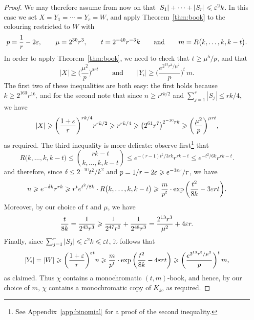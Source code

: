 \begin{proof}
  We may therefore assume from now on that  $|S_1| + \cdots + |S_r| \leqslant \varepsilon^2 k$. 
  In this case we set $X = Y_1 = \cdots = Y_r = W$, and apply Theorem~\ref{thm:book} to the colouring restricted to $W$ with 
  $$p = \frac{1}{r} - 2\varepsilon, \qquad \mu = 2^{30} r^3, \qquad t = 2^{-40} r^{-3} k \qquad \text{and} \qquad m = R\big( k, \ldots, k, k - t \big).$$
  In order to apply Theorem~\ref{thm:book}, we need to check that $t \ge \mu^5/p$, and that
  $$|X| \ge \bigg( \frac{\mu^2}{p} \bigg)^{\mu r t} \qquad \text{and} \qquad |Y_i| \ge \bigg( \frac{e^{2^{13} r^3 / \mu^2}}{p} \bigg)^t \, m.$$
  The first two of these inequalities are both easy: the first holds because $k \ge 2^{160} r^{16}$, and for the second note that since $n \ge r^{rk/2}$ and $\sum_{j = 1}^r |S_j| \le rk/4$, we have
  $$|X| \geqslant \bigg( \frac{1+\varepsilon}{r} \bigg)^{rk/4} r^{rk/2} \geqslant r^{rk/4} \geqslant \big( 2^{61} r^7 \big)^{2^{-10} r k} \geqslant \bigg( \frac{\mu^2}{p} \bigg)^{\mu r t},$$
  as required. The third inequality is more delicate: observe first\footnote{See Appendix~\ref{app:binomial} for a proof of the second inequality.} that 
  $$R\big( k, \ldots, k, k-t \big) \le \binom{rk-t}{k,\dots,k,k-t} \le e^{-(r-1)t^2/3rk} r^{rk-t} \le e^{-t^2/6k} r^{rk-t}.$$
  and therefore, since $\delta \le 2^{-10} t^2/k^2$ and $p = 1/r - 2\varepsilon \geqslant e^{-3\varepsilon r} / r$, we have 
  $$n \geqslant e^{-\delta k} r^{rk} \geqslant r^t e^{t^2/8k} \cdot R\big( k, \ldots, k, k-t \big) \geqslant \frac{m}{p^t} \cdot \exp\bigg( \frac{t^2}{8k} - 3\varepsilon r t \bigg).$$
  Moreover, by our choice of $t$ and $\mu$, we have 
  $$\frac{t}{8k} = \frac{1}{2^{43} r^3} \geqslant \frac{1}{2^{47}r^3} + \frac{1}{2^{48}r^3} = \frac{2^{13} r^3}{\mu^2} + 4\varepsilon r.$$
  Finally, since $\sum_{j = 1}^r |S_j| \leqslant \varepsilon^2 k \leqslant \varepsilon t$, it follows that
  $$|Y_i| = |W| \geqslant \bigg( \frac{1+\varepsilon}{r} \bigg)^{\varepsilon t} n \geqslant \frac{m}{p^t} \cdot \exp\bigg( \frac{t^2}{8k} - 4\varepsilon r t \bigg) \geqslant \bigg( \frac{e^{2^{13} r^3 / \mu^2}}{p} \bigg)^t \, m,$$
  as claimed. Thus $\chi$ contains a monochromatic $(t,m)$-book, and hence, by our choice of $m$, $\chi$ contains a monochromatic copy of $K_k$, as required.
\end{proof}